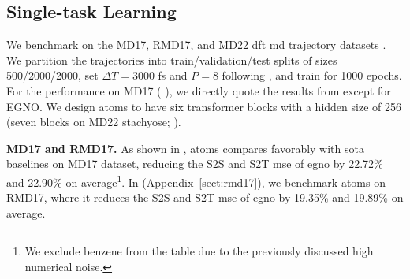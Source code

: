 \subsection{Single-task Learning}
\label{sec:singletask_learning}
We benchmark on the MD17, RMD17, {and MD22} \gls{dft} \gls{md} trajectory datasets \cite{chmiela_machine_2017, christensen_role_2020, chmiela_accurate_2023}. We partition the trajectories into train/validation/test splits of sizes 500/2000/2000, set \(\Delta T = 3000\) fs and \(P = 8\) following \cite{xu_equivariant_2024}, and train for 1000 epochs. For the performance on MD17 ( ), we directly quote the results from \cite{xu_equivariant_2024} except for EGNO. 
We design \gls{atoms} to have six transformer blocks with a hidden size of 256 (seven blocks on MD22 stachyose; ).

\textbf{MD17 and RMD17.} 
As shown in , \gls{atoms} compares favorably with \gls{sota} baselines on MD17 dataset, 
reducing the S2S and S2T \gls{mse} of \gls{egno} by 22.72\% and 22.90\% on average\footnote{We exclude benzene from the table due to the previously discussed high numerical noise.}. In  (Appendix~\ref{sect:rmd17}), we benchmark \gls{atoms} on RMD17, where it reduces the S2S and S2T \gls{mse} of \gls{egno} by 19.35\% and 19.89\% on average.


